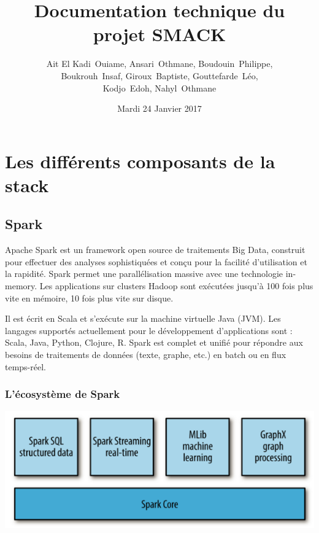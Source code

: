 \documentclass[a4paper, 11pt, titlepage]{article}
\title {{ {\huge Documentation technique du projet SMACK }} }
\author{%
    {\sc Ait El Kadi}~Ouiame,
    {\sc Ansari}~Othmane,
    {\sc Boudouin}~Philippe,\\
    {\sc Boukrouh}~Insaf,
    {\sc Giroux}~Baptiste,
    {\sc Gouttefarde}~Léo,\\
    {\sc Kodjo}~Edoh,
    {\sc Nahyl}~Othmane
}
\date{Mardi 24 Janvier 2017}
\begin{document}
\pagestyle{fancy}
\maketitle

\setcounter{tocdepth}{2}

\tableofcontents
\newpage

\section {Les différents composants de la stack}

\subsection {Spark}

Apache Spark est un framework open source de traitements Big Data, construit pour effectuer des analyses sophistiquées et conçu pour la facilité d'utilisation et la rapidité.
Spark permet une parallélisation massive avec une technologie in-memory. Les applications sur clusters Hadoop sont exécutées jusqu'à 100 fois plus vite en mémoire, 10 fois plus vite sur disque.

Il est écrit en Scala et s'exécute sur la machine virtuelle Java (JVM). Les langages supportés actuellement pour le développement d'applications sont : Scala, Java, Python, Clojure, R. Spark est complet et unifié pour répondre aux besoins de traitements de données (texte, graphe, etc.) en batch ou en flux temps-réel.


\subsubsection* {L'écosystème de Spark}

\begin{center}
\includegraphics[scale=0.5]{res/eco_spark.png}
\end{center}
\end{document}
